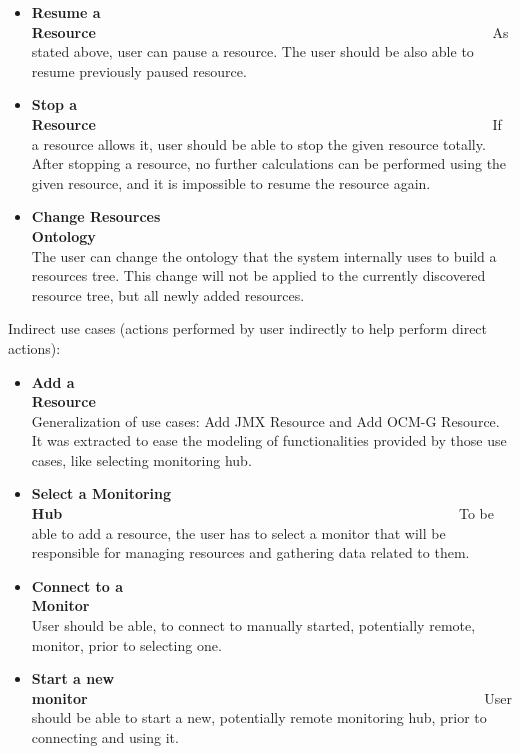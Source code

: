 \begin{itemize}
\item {\bf Resume a Resource}~~~~~~~~~~~~~~~~~~~~~~~~~~~~~~~~~~~~~~~~~~~~~~~~~~~~~~~~\linebreak
As stated above, user can pause a resource. The user should be also able to resume previously paused resource.

\item {\bf Stop a Resource}~~~~~~~~~~~~~~~~~~~~~~~~~~~~~~~~~~~~~~~~~~~~~~~~~~~~~~~~\linebreak
If a resource allows it, user should be able to stop the given resource totally. After stopping a resource, no further calculations can be performed using the given resource, and it is impossible to resume the resource again.

\item {\bf Change Resources Ontology}~~~~~~~~~~~~~~~~~~~~~~~~~~~~~~~~~~~~~~~~~~~~~~~~~~~~~~~~\linebreak
The user can change the ontology that the system internally uses to build a resources tree. This change will not  be applied to the currently discovered resource tree, but all newly added resources.

\end{itemize}


Indirect use cases (actions performed by user indirectly to help perform direct actions):

\begin{itemize}

\item {\bf Add a Resource}~~~~~~~~~~~~~~~~~~~~~~~~~~~~~~~~~~~~~~~~~~~~~~~~~~~~~~~~\linebreak
Generalization of use cases: Add JMX Resource and Add OCM-G Resource. It was extracted to ease the modeling of functionalities provided by those use cases, like selecting monitoring hub.

\item {\bf Select a Monitoring Hub}~~~~~~~~~~~~~~~~~~~~~~~~~~~~~~~~~~~~~~~~~~~~~~~~~~~~~~~~\linebreak
To be able to add a resource, the user has to select a monitor that will be responsible for managing resources and gathering data related to them.

\item {\bf Connect to a Monitor}~~~~~~~~~~~~~~~~~~~~~~~~~~~~~~~~~~~~~~~~~~~~~~~~~~~~~~~~\linebreak
User should be able, to connect to manually started, potentially remote, monitor, prior to selecting one.

\item {\bf Start a new monitor}~~~~~~~~~~~~~~~~~~~~~~~~~~~~~~~~~~~~~~~~~~~~~~~~~~~~~~~~\linebreak
User should be able to start a new, potentially remote monitoring hub, prior to connecting and using it.

\end{itemize}

